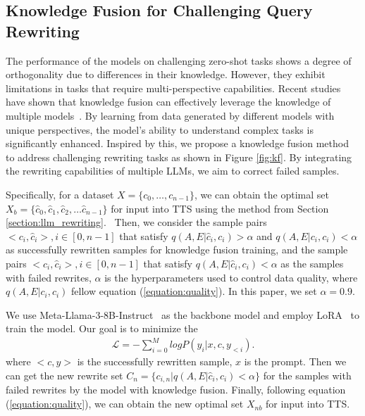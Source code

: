 \documentclass[11pt]{article}
\begin{document}
	\subsection{Knowledge Fusion for Challenging Query Rewriting}
	The performance of the models on challenging zero-shot tasks shows a degree of orthogonality due to differences in their knowledge. 
	However, they exhibit limitations in tasks that require multi-perspective capabilities.
	Recent studies have shown that knowledge fusion can effectively leverage the knowledge of multiple models~\citep{wan2024fusechatknowledgefusionchat}. 
	By learning from data generated by different models with unique perspectives, the model’s ability to understand complex tasks is significantly enhanced.
	Inspired by this, we propose a knowledge fusion method to address challenging rewriting tasks as shown in Figure \ref{fig:kf}. By integrating the rewriting capabilities of multiple LLMs, we aim to correct failed samples.

	Specifically, for a dataset $X=\{c_0,\dots,c_{n-1}\}$, we can obtain the optimal set $X_b=\{ \hat{c}_0,\hat{c}_1,\hat{c}_2,\dots \hat{c}_{n-1}\}$ for input into TTS using the method from Section \ref{section:llm_rewriting}.~%
	Then, we consider the sample pairs $<c_i,\hat{c}_i>,i \in [0,n-1]$ that satisfy $q(A,E|\hat{c}_i,c_i)>\alpha$ and $q(A,E|c_i,c_i)<\alpha$ as successfully rewritten samples for knowledge fusion training,  and the  sample pairs $<c_i,\hat{c}_i>,i \in [0,n-1]$ that satisfy $q(A,E|\hat{c}_i,c_i)<\alpha$ as the samples with failed rewrites, $\alpha$ is the hyperparameters used to control data quality, where $q(A,E|c_i,c_i)$ fellow equation (\ref{equation:quality}).  In this paper, we set $\alpha=0.9$.
	
	
	We use Meta-Llama-3-8B-Instruct~\citep{dubey2024llama3herdmodels} as the backbone model and employ LoRA~\citep{hu2021loralowrankadaptationlarge} to train the model. Our goal is to minimize the 
	\begin{equation}
		\begin{aligned}
			\mathcal{L} =-\sum_{i=0}^{M} logP\left( y_{i}|x,c,y_{<i} \right).
		\end{aligned}
	\end{equation}
	where $<c, y>$ is the successfully rewritten sample, $x$ is the prompt.  %
	Then we can get the new rewrite set $C_n=\{c_{i,n} | q(A,E|\hat{c}_i,c_i)<\alpha\}$ for the samples with failed rewrites by the model with knowledge fusion.
	Finally, following equation (\ref{equation:quality}), we can obtain the new optimal set $X_{nb}$ for input into TTS.
\end{document}
